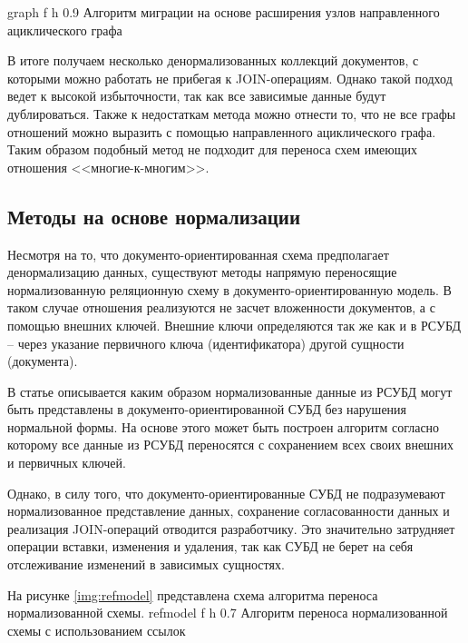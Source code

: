 \clearpage

    {graph} %
    {f} %
    {h} %
    {0.9\textwidth} %
    {Алгоритм миграции на основе расширения узлов направленного ациклического графа} %
    
В итоге получаем несколько денормализованных коллекций документов, с которыми можно работать не прибегая к JOIN-операциям.
Однако такой подход ведет к высокой избыточности, так как все зависимые данные будут дублироваться.
Также к недостаткам метода можно отнести то, что не все графы отношений можно выразить с помощью направленного ациклического графа.
Таким образом подобный метод не подходит для переноса схем имеющих отношения <<многие-к-многим>>. 

\clearpage
\subsection{Методы на основе нормализации}
Несмотря на то, что документо-ориентированная схема предполагает денормализацию данных,
существуют методы напрямую переносящие нормализованную реляционную схему в документо-ориентированную модель.
В таком случае отношения реализуются не засчет вложенности документов, а с помощью внешних ключей.
Внешние ключи определяются так же как и в РСУБД -- через указание первичного ключа (идентификатора) другой сущности (документа).

В статье \cite{reference} описывается каким образом нормализованные данные из РСУБД могут быть представлены в документо-ориентированной СУБД без нарушения нормальной формы.
На основе этого может быть построен алгоритм согласно которому все данные из РСУБД переносятся с сохранением всех своих внешних и первичных ключей.

Однако, в силу того, что документо-ориентированные СУБД не подразумевают нормализованное представление данных, сохранение согласованности данных и реализация JOIN-операций отводится разработчику.
Это значительно затрудняет операции вставки, изменения и удаления, так как СУБД не берет на себя отслеживание изменений в зависимых сущностях. 

\clearpage
На рисунке \ref{img:refmodel} представлена схема алгоритма переноса нормализованной схемы.
    {refmodel} %
    {f} %
    {h} %
    {0.7\textwidth} %
    {Алгоритм переноса нормализованной схемы с использованием ссылок} %

